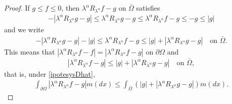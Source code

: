 \documentclass[11pt,a4paper]{article}
\begin{document}
\begin{proof}
If $g \leq f \leq 0$, then $\lambda^\alpha R_{\lambda^\alpha} f - g$ on $\bar{\Omega}$ satisfies
\begin{align*}
-  | \lambda^\alpha R_{\lambda^\alpha} g - g |  \leq \lambda^\alpha R_{\lambda^\alpha} g - g \leq  \lambda^\alpha R_{\lambda^\alpha} f - g \leq -g \leq |g|
\end{align*}
and we write
\begin{align*}
- | \lambda^\alpha R_{\lambda^\alpha} g - g | - |g|  \leq \lambda^\alpha R_{\lambda^\alpha} f - g \leq |g| + | \lambda^\alpha R_{\lambda^\alpha} g - g |  \quad \textrm{on } \bar{\Omega}.
\end{align*}
This means that $| \lambda^\alpha R_{\lambda^\alpha} f - f | = | \lambda^\alpha R_{\lambda^\alpha} f - g |$ on $\partial \Omega$ and  
\begin{align*}
| \lambda^\alpha R_{\lambda^\alpha} f - g | \leq |g| + | \lambda^\alpha R_{\lambda^\alpha} g - g | \quad \textrm{on } \bar{\Omega}, 
\end{align*}
that is, under \eqref{ipotesysDhat},
\begin{align}
\int_{\partial \Omega}  |\lambda^\alpha R_{\lambda^\alpha} f - g|  m(dx) \leq \int_{\bar{\Omega}} \left( |g| + |\lambda^\alpha R_{\lambda^\alpha} g - g|\right)  m(dx).
\label{boundL1gRg}
\end{align}



\end{proof}
\end{document}
